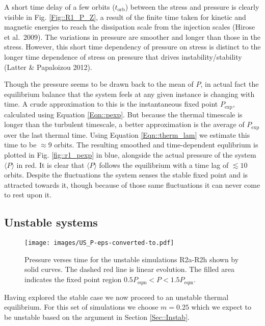 \documentclass[useAMS]{mn2e}
\begin{document}
A short time delay of a few orbits ($t_{\text{orb}}$) between the stress and pressure
is clearly visible in Fig. \ref{Fig::R1_P_Z}, a result of the finite
time taken for kinetic and magnetic energies to reach the dissipation
scale from the injection scales (Hirose et al.~2009). 
The variations in pressure are smoother and longer
than those in the stress. However, this short time dependency of pressure on
stress is distinct to
the longer time dependence of stress on pressure that drives
instability/stability (Latter \& Papaloizou 2012).


Though the pressure seems to be drawn back to the mean of $P$, 
in actual fact the equilibrium balance that the system feels at
any given instance is changing with time. A crude approximation to
this is the instantaneous fixed point $P_{\text{exp}}$,
calculated using Equation \eqref{Eqn::pexp}. But because the thermal
timescale is longer than the turbulent timescale, a better
approximation is the average of $P_{\text{exp}}$ over the last thermal time.
Using Equation
\eqref{Eqn::therm_lam} we estimate this time to be $\approx
9$ orbits. The resulting smoothed and time-dependent equlibrium is
plotted in Fig. \ref{fig::r1_pexp} in blue, alongside the actual
pressure of the system $\langle
P\rangle$ in red. 
It is clear that $\langle
P\rangle$ follows the equilibrium with a time lag of
$\lesssim 10$ orbits. Despite the fluctuations the
system senses the stable fixed point and is attracted towards it,
though because of those same fluctuations it can never come to rest
upon it. 




\subsection{Unstable systems}


\begin{figure*}
\texttt{[image: images/US\_P-eps-converted-to.pdf]}
\caption{Pressure verses time for the unstable simulations R2a-R2h shown by solid curves. The dashed red line is linear evolution. The filled area indicates the fixed point region $0.5P_{\text{eqm}}<P<1.5P_{\text{eqm}}$.}
\label{fig::UN_P_S}
\end{figure*}



Having explored the stable case we now proceed to an
unstable thermal equilibrium. For this set of simulations we choose
$m=0.25$ which we expect to be unstable 
based on the argument in Section \ref{Sec::Instab}. 
\end{document}

